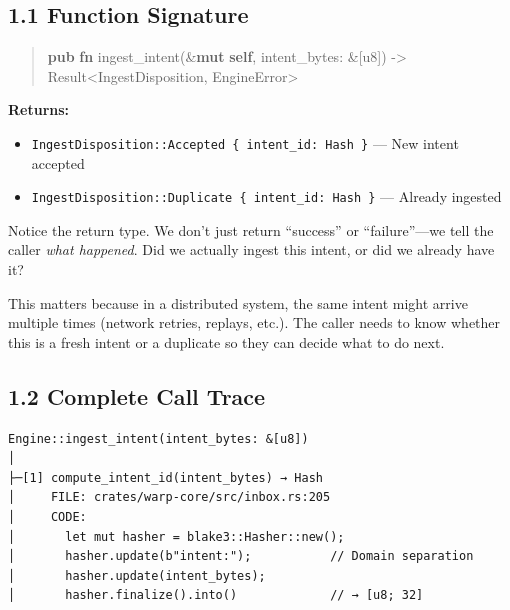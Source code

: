 \documentclass[11pt]{book}
\newenvironment{Shaded}{\begin{quote}}{\end{quote}}
\newcommand{\DataTypeTok}[1]{\textcolor[rgb]{0.56,0.13,0.00}{#1}}
\newcommand{\KeywordTok}[1]{\textcolor[rgb]{0.00,0.44,0.13}{\textbf{#1}}}
\newcommand{\NormalTok}[1]{#1}
\newcommand{\OperatorTok}[1]{\textcolor[rgb]{0.40,0.40,0.40}{#1}}
\newenvironment{directors}
{\begin{mdframed}[
  linecolor=blue!60,
  linewidth=2pt,
  leftline=true,
  rightline=false,
  topline=false,
  bottomline=false,
  backgroundcolor=blue!3,
  innerleftmargin=12pt,
  innerrightmargin=10pt,
  innertopmargin=8pt,
  innerbottommargin=8pt,
  skipabove=12pt,
  skipbelow=12pt
]\small\sffamily\color{blue!70!black}}
{\end{mdframed}}
\begin{document}
\subsection{1.1 Function Signature}

\begin{Shaded}
\begin{Highlighting}[]
\KeywordTok{pub} \KeywordTok{fn}\NormalTok{ ingest\_intent(}\OperatorTok{\&}\KeywordTok{mut} \KeywordTok{self}\OperatorTok{,}\NormalTok{ intent\_bytes}\OperatorTok{:} \OperatorTok{\&}\NormalTok{[}\DataTypeTok{u8}\NormalTok{]) }\OperatorTok{{-}\textgreater{}} \DataTypeTok{Result}\OperatorTok{\textless{}}\NormalTok{IngestDisposition}\OperatorTok{,}\NormalTok{ EngineError}\OperatorTok{\textgreater{}}
\end{Highlighting}
\end{Shaded}

\textbf{Returns:}
\begin{itemize}
\item \texttt{IngestDisposition::Accepted \{ intent\_id: Hash \}} --- New intent accepted
\item \texttt{IngestDisposition::Duplicate \{ intent\_id: Hash \}} --- Already ingested
\end{itemize}

\begin{directors}
Notice the return type. We don't just return ``success'' or ``failure''---we tell the caller \emph{what happened}. Did we actually ingest this intent, or did we already have it?

This matters because in a distributed system, the same intent might arrive multiple times (network retries, replays, etc.). The caller needs to know whether this is a fresh intent or a duplicate so they can decide what to do next.
\end{directors}

\subsection{1.2 Complete Call Trace}

\begin{verbatim}
Engine::ingest_intent(intent_bytes: &[u8])
│
├─[1] compute_intent_id(intent_bytes) → Hash
│     FILE: crates/warp-core/src/inbox.rs:205
│     CODE:
│       let mut hasher = blake3::Hasher::new();
│       hasher.update(b"intent:");           // Domain separation
│       hasher.update(intent_bytes);
│       hasher.finalize().into()             // → [u8; 32]
\end{verbatim}
\end{document}
